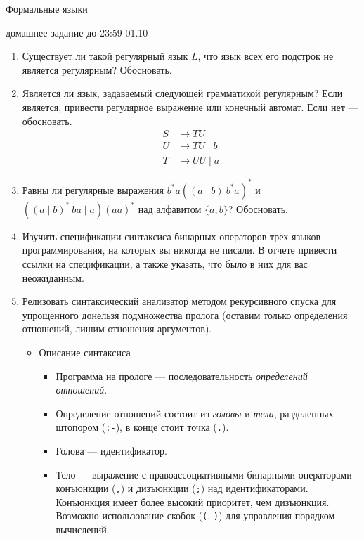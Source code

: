 \documentclass[12pt]{article}
\begin{document}
\begin{center} {\LARGE Формальные языки} \end{center}

\begin{center} \Large домашнее задание до 23:59 01.10 \end{center}
\bigskip

\begin{enumerate}
  \item
  {
    Существует ли такой регулярный язык $L$, что язык всех его подстрок не является регулярным? Обосновать.
  }
  \item
  {
    Является ли язык, задаваемый следующей грамматикой регулярным? Если является, привести регулярное выражение или конечный автомат. Если нет --- обосновать.
    \begin{align*}
      S &\to T U \\
      U &\to T U \mid b \\
      T &\to U U \mid a
    \end{align*}
  }
  \item
  {
    Равны ли регулярные выражения $b^* a ((a \mid b) \ b^* a)^*$ и $((a \mid b)^* \ b a \mid a)(aa)^*$ над алфавитом $\{a, b\}$? Обосновать.
  }
  \item
  {
    Изучить спецификации синтаксиса бинарных операторов трех языков программирования, на которых вы никогда не писали. В отчете привести ссылки на спецификации, а также указать, что было в них для вас неожиданным.
  }
  \item
  {
    Релизовать синтаксический анализатор методом рекурсивного спуска для упрощенного донельзя подмножества пролога (оставим только определения отношений, лишим отношения аргументов).
    \begin{itemize}
      \item Описание синтаксиса
      \begin{itemize}
        \item Программа на прологе --- последовательность \emph{определений отношений}.
        \item Определение отношений состоит из \emph{головы} и \emph{тела}, разделенных штопором (\verb!:-!), в конце стоит точка (\verb!.!).
        \item Голова --- идентификатор.
        \item Тело --- выражение с правоассоциативными бинарными операторами конъюнкции (\verb!,!) и дизъюнкции (\verb!;!) над идентификаторами. Конъюнкция имеет более высокий приоритет, чем дизъюнкция. Возможно использование скобок (\verb!(!, \verb!)!) для управления порядком вычислений.

\end{itemize}
\end{itemize}}
\end{enumerate}
\end{document}
